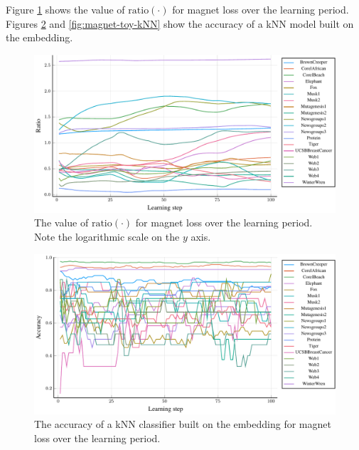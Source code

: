 Figure \ref{fig:magnet-toy-ratio} shows the value of \( \mathrm{ratio} \left( \cdot \right) \) for magnet loss over the learning period. Figures \ref{fig:magnet-toy-accuracy} and \ref{fig:magnet-toy-kNN} show the accuracy of a kNN model built on the embedding.

\begin{figure}[h]
  \centering
  \includegraphics[width=\textwidth]{images/magnet-toy/ratio/magnet-toy-ratio.pdf}
  \caption{The value of \( \mathrm{ratio} \left( \cdot \right) \) for magnet loss over the learning period. Note the logarithmic scale on the \( y \) axis.}\label{fig:magnet-toy-ratio}
\end{figure}

\begin{figure}[h]
  \centering
  \includegraphics[width=\textwidth]{images/magnet-toy/accuracy/magnet-toy-accuracy.pdf}
  \caption{The accuracy of a kNN classifier built on the embedding for magnet loss over the learning period.}\label{fig:magnet-toy-accuracy}
\end{figure}

